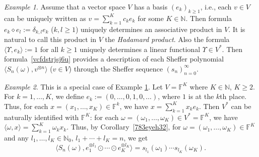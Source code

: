 \documentclass[12pt]{article}
\theoremstyle{remark}
\theoremstyle{remark}
\newtheorem{example}{Example}
\theoremstyle{remark}
\begin{document}
\begin{example}\label{vctstszzz}
Assume that a vector space $V$ has a basis $(e_k)_{k\geq1}$, i.e., each $v\in V$ can be uniquely written as $v=\sum_{k=1}^K c_ke_k$  for some $K\in\mathbb N$. Then formula 
$e_k\diamond e_l:=\delta_{k,l}e_k$ ($k,l\ge1$) uniquely determines an associative product in $V$.  It is natural to call this product in $V$ the {\it Hadamard product}.
Also the formula $\langle \Upsilon,e_k\rangle:=1$ for all $k\ge1$ uniquely determines a linear functional $\Upsilon\in V^*$. Then formula~\eqref{vcfdstrjsj6u} provides a description of each Sheffer polynomial $\langle S_n(\omega),v^{\otimes n}\rangle$  ($v\in V$) through the Sheffer sequence $(s_n)_{n=0}^\infty$.


\end{example}

\begin{example} This is a special case of Example \ref{vctstszzz}. Let $V=\mathbb F^K$ where $K\in\mathbb N$, $K\ge2$. For $k=1,\dots, K$, we define $e_k:=(0,\dots,0,1,0,\dots)$,  where $1$ is at the $k$th place. Thus, for each $x=(x_1,\dots,x_K)\in \mathbb F^k$, we have $x=\sum_{k=1}^K x_ke_k$. Then $V^*$ can be naturally identified with $\mathbb F^K$: for each $\omega=(\omega_1,\dots,\omega_K)\in V^*=\mathbb F^K$, we have
$\langle \omega,x\rangle=\sum_{k=1}^K\omega_kx_k$.
Thus, by Corollary~\ref{783eyeh32}, for $\omega=(\omega_1,\dots,\omega_K)\in \mathbb F^K$ and any $l_1,\dots,l_K\in \mathbb N_0$, $l_1+\cdots+l_K=n$, we get 
\begin{equation*}\langle S_n(\omega),e_1^{\otimes l_1}\odot\cdots\odot e_K^{\otimes l_K}\rangle=s_{l_1}(\omega_1)\cdots s_{l_K}(\omega_K).\end{equation*}
\end{example}
\end{document}
